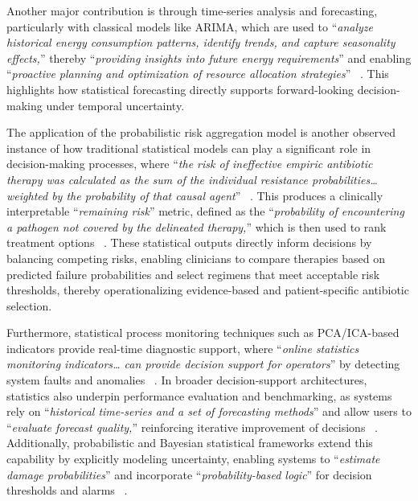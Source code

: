 \documentclass{sfuthesis}
\begin{document}
Another major contribution is through time-series analysis and forecasting, particularly with classical models like ARIMA, which are used to “\textit{analyze historical energy consumption patterns, identify trends, and capture seasonality effects,}” thereby “\textit{providing insights into future energy requirements}” and enabling “\textit{proactive planning and optimization of resource allocation strategies}” ~\cite{krishnan2024data}. This highlights how statistical forecasting directly supports forward-looking decision-making under temporal uncertainty.\par
The application of the probabilistic risk aggregation model is another observed instance of how traditional statistical models can play a significant role in decision-making processes, where “\textit{the risk of ineffective empiric antibiotic therapy was calculated as the sum of the individual resistance probabilities…weighted by the probability of that causal agent}” ~\cite{muller2021risk}. This produces a clinically interpretable “\textit{remaining risk}” metric, defined as the “\textit{probability of encountering a pathogen not covered by the delineated therapy,}” which is then used to rank treatment options ~\cite{muller2021risk}. These statistical outputs directly inform decisions by balancing competing risks, enabling clinicians to compare therapies based on predicted failure probabilities and select regimens that meet acceptable risk thresholds, thereby operationalizing evidence-based and patient-specific antibiotic selection.\par
Furthermore, statistical process monitoring techniques such as PCA/ICA-based indicators provide real-time diagnostic support, where “\textit{online statistics monitoring indicators… can provide decision support for operators}” by detecting system faults and anomalies ~\cite{kim2025development}. In broader decision-support architectures, statistics also underpin performance evaluation and benchmarking, as systems rely on “\textit{historical time-series and a set of forecasting methods}” and allow users to “\textit{evaluate forecast quality,}” reinforcing iterative improvement of decisions ~\cite{Kozielski2021LPGDSS}. Additionally, probabilistic and Bayesian statistical frameworks extend this capability by explicitly modeling uncertainty, enabling systems to “\textit{estimate damage probabilities}” and incorporate “\textit{probability-based logic}” for decision thresholds and alarms ~\cite{Monti2025RailwayBridgeDSS}.
\end{document}
